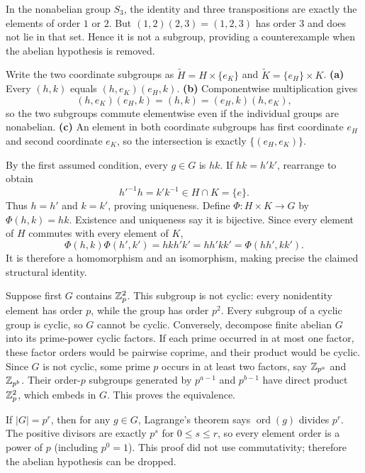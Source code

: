 In the nonabelian group $S_3$, the identity and three transpositions are exactly the elements of order $1$ or $2$. But $(1,2)(2,3)=(1,2,3)$ has order $3$ and does not lie in that set. Hence it is not a subgroup, providing a counterexample when the abelian hypothesis is removed.

Write the two coordinate subgroups as $\widetilde H=H\times\{e_K\}$ and $\widetilde K=\{e_H\}\times K$.
\textbf{(a)} Every $(h,k)$ equals $(h,e_K)(e_H,k)$.
\textbf{(b)} Componentwise multiplication gives
\[(h,e_K)(e_H,k)=(h,k)=(e_H,k)(h,e_K),\]
so the two subgroups commute elementwise even if the individual groups are nonabelian.
\textbf{(c)} An element in both coordinate subgroups has first coordinate $e_H$ and second coordinate $e_K$, so the intersection is exactly $\{(e_H,e_K)\}$.

By the first assumed condition, every $g\in G$ is $hk$. If $hk=h'k'$, rearrange to obtain
\[h'^{-1}h=k'k^{-1}\in H\cap K=\{e\}.
\]
Thus $h=h'$ and $k=k'$, proving uniqueness. Define $\Phi:H\times K\to G$ by $\Phi(h,k)=hk$. Existence and uniqueness say it is bijective. Since every element of $H$ commutes with every element of $K$,
\[\Phi(h,k)\Phi(h',k')=hkh'k'=hh'kk'=\Phi(hh',kk').\]
It is therefore a homomorphism and an isomorphism, making precise the claimed structural identity.

Suppose first $G$ contains $\mathbb{Z}_p^2$. This subgroup is not cyclic: every nonidentity element has order $p$, while the group has order $p^2$. Every subgroup of a cyclic group is cyclic, so $G$ cannot be cyclic.
Conversely, decompose finite abelian $G$ into its prime-power cyclic factors. If each prime occurred in at most one factor, these factor orders would be pairwise coprime, and their product would be cyclic. Since $G$ is not cyclic, some prime $p$ occurs in at least two factors, say $\mathbb{Z}_{p^a}$ and $\mathbb{Z}_{p^b}$. Their order-$p$ subgroups generated by $p^{a-1}$ and $p^{b-1}$ have direct product $\mathbb{Z}_p^2$, which embeds in $G$. This proves the equivalence.

If $|G|=p^r$, then for any $g\in G$, Lagrange's theorem says $\operatorname{ord}(g)$ divides $p^r$. The positive divisors are exactly $p^s$ for $0\le s\le r$, so every element order is a power of $p$ (including $p^0=1$). This proof did not use commutativity; therefore the abelian hypothesis can be dropped.

